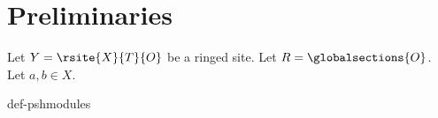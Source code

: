 \chapter{Preliminaries}

Let $Y = \rsite{X}{T}{O}$ be a ringed site.
Let $R = \globalsections{O}$. Let $a,b\in X$.


{def-pshmodules}
